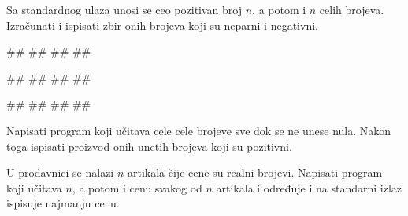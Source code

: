 \begin{Exercise}[label=p1.3_01] 
Sa standardnog ulaza unosi se ceo pozitivan broj $n$, a potom i $n$
celih brojeva. Izračunati i ispisati zbir onih brojeva koji su neparni
i negativni. 

\begin{miditest}
\begin{upotreba}{1}
#\naslovInt#
##
##
##
\end{upotreba}
\end{miditest}
\begin{miditest}
\begin{upotreba}{2}
#\naslovInt#
##
##
##
\end{upotreba}
\end{miditest}

\begin{miditest}
\begin{upotreba}{3}
#\naslovInt#
##
##
##
\end{upotreba}
\end{miditest}
\end{Exercise}
\begin{Answer}[ref=p1.3_01]
\end{Answer}


\begin{Exercise}[label=v1.3_05] 
Napisati program koji učitava cele cele brojeve sve dok se ne unese
nula. Nakon toga ispisati proizvod onih unetih brojeva koji su
pozitivni.  
\end{Exercise}
\begin{Answer}[ref=v1.3_05]
\end{Answer}

\begin{Exercise}[label=v1.3_12] 
U prodavnici se nalazi $n$ artikala čije cene su realni
brojevi. Napisati program koji učitava $n$, a potom i cenu svakog od
$n$ artikala i određuje i na standarni izlaz ispisuje najmanju
cenu.  
\end{Exercise}
\begin{Answer}[ref=v1.3_12]
\end{Answer}

